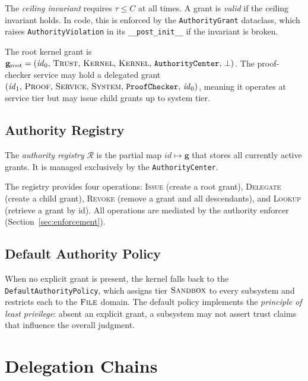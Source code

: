 \documentclass[11pt]{article}
\newcommand{\AGrant}{\mathbf{g}}            %
\newcommand{\ARoot}{\mathbf{g}_{\mathrm{root}}} %
\newcommand{\AuthReg}{\mathcal{R}}          %
\newcommand{\TierKERNEL}{\textsc{Kernel}}
\newcommand{\TierSYSTEM}{\textsc{System}}
\newcommand{\TierSERVICE}{\textsc{Service}}
\newcommand{\TierSANDBOX}{\textsc{Sandbox}}
\newcommand{\DomTRUST}{\textsc{Trust}}
\newcommand{\DomPROOF}{\textsc{Proof}}
\newcommand{\DomFILE}{\textsc{File}}
\begin{document}
The \emph{ceiling invariant} requires $\tau \leq C$ at all times.
A grant is \emph{valid} if the ceiling invariant holds.
In code, this is enforced by the \texttt{AuthorityGrant} dataclass,
which raises \texttt{AuthorityViolation} in its \texttt{\_\_post\_init\_\_}
if the invariant is broken.

\begin{example}
The root kernel grant is
$\ARoot = (\mathit{id}_0,\, \DomTRUST,\, \TierKERNEL,\, \TierKERNEL,\,
           \texttt{AuthorityCenter},\, \bot)$.
The proof-checker service may hold a delegated grant
$(\mathit{id}_1,\, \DomPROOF,\, \TierSERVICE,\, \TierSYSTEM,\,
  \texttt{ProofChecker},\, \mathit{id}_0)$,
meaning it operates at service tier but may issue child grants up to
system tier.
\end{example}

\subsection{Authority Registry}

\begin{definition}\label{def:registry}
The \emph{authority registry} $\AuthReg$ is the partial map
$\mathit{id} \mapsto \AGrant$ that stores all currently active grants.
It is managed exclusively by the \texttt{AuthorityCenter}.
\end{definition}

The registry provides four operations:
\textsc{Issue} (create a root grant),
\textsc{Delegate} (create a child grant),
\textsc{Revoke} (remove a grant and all descendants), and
\textsc{Lookup} (retrieve a grant by id).
All operations are mediated by the authority enforcer
(Section~\ref{sec:enforcement}).

\subsection{Default Authority Policy}

When no explicit grant is present, the kernel falls back to
the \texttt{DefaultAuthorityPolicy}, which assigns tier
$\TierSANDBOX$ to every subsystem and restricts each to the
$\DomFILE$ domain.  The default policy implements the
\emph{principle of least privilege}: absent an explicit grant,
a subsystem may not assert trust claims that influence the overall
judgment.

\section{Delegation Chains}\label{sec:chains}
\end{document}
